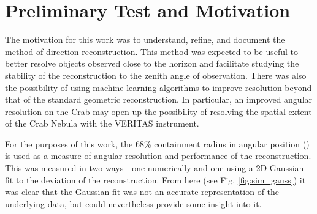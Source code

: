 \documentclass[main.tex]{subfiles}
\begin{document}
\section{Preliminary Test and Motivation}
The motivation for this work was to understand, refine, and document the \disp method of direction reconstruction. This method was expected to be useful to better resolve objects observed close to the horizon and facilitate studying the stability of the reconstruction to the zenith angle of observation. There was also the possibility of using machine learning algorithms to improve resolution beyond that of the standard geometric reconstruction. In particular, an improved angular resolution on the Crab may open up the possibility of resolving the spatial extent of the Crab Nebula with the VERITAS instrument.

For the purposes of this work, the 68\% containment radius in angular position (\rse\hspace{-4pt}) is used as a measure of angular resolution and performance of the reconstruction. This was measured in two ways - one numerically and one using a 2D Gaussian fit to the deviation of the reconstruction. From here (see Fig. \ref{fig:sim_gauss}) it was clear that the Gaussian fit was not an accurate representation of the underlying data, but could nevertheless provide some insight into it.
\end{document}
